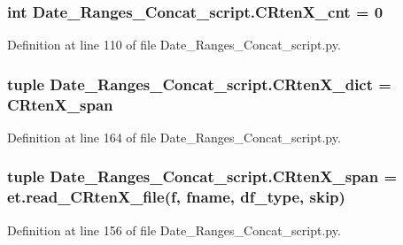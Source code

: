 \subsubsection[{C\+Rten\+X\+\_\+cnt}]{\setlength{\rightskip}{0pt plus 5cm}int Date\+\_\+\+Ranges\+\_\+\+Concat\+\_\+script.\+C\+Rten\+X\+\_\+cnt = 0}\label{namespace_date___ranges___concat__script_a75f2d0ae1ff003c8439ef1b27e325461}


Definition at line 110 of file Date\+\_\+\+Ranges\+\_\+\+Concat\+\_\+script.\+py.

\hypertarget{namespace_date___ranges___concat__script_ab3db8ce6ea71d1628a0e07ede31f9548}{}
\subsubsection[{C\+Rten\+X\+\_\+dict}]{\setlength{\rightskip}{0pt plus 5cm}tuple Date\+\_\+\+Ranges\+\_\+\+Concat\+\_\+script.\+C\+Rten\+X\+\_\+dict = {\bf C\+Rten\+X\+\_\+span}}\label{namespace_date___ranges___concat__script_ab3db8ce6ea71d1628a0e07ede31f9548}


Definition at line 164 of file Date\+\_\+\+Ranges\+\_\+\+Concat\+\_\+script.\+py.

\hypertarget{namespace_date___ranges___concat__script_a14993873c47661e76372d5bf18cc9384}{}
\subsubsection[{C\+Rten\+X\+\_\+span}]{\setlength{\rightskip}{0pt plus 5cm}tuple Date\+\_\+\+Ranges\+\_\+\+Concat\+\_\+script.\+C\+Rten\+X\+\_\+span = et.\+read\+\_\+\+C\+Rten\+X\+\_\+file({\bf f}, fname, {\bf df\+\_\+type}, {\bf skip})}\label{namespace_date___ranges___concat__script_a14993873c47661e76372d5bf18cc9384}


Definition at line 156 of file Date\+\_\+\+Ranges\+\_\+\+Concat\+\_\+script.\+py.

\hypertarget{namespace_date___ranges___concat__script_abb2bf9b40692c8d7be5ca5538b9b5149}{}
